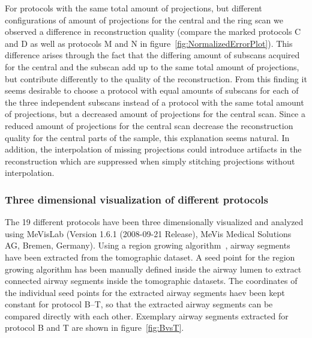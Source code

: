 For protocols with the same total amount of projections, but different configurations of amount of projections for the central and the ring scan we observed a difference in reconstruction quality (compare the marked protocols C and D as well as protocols M and N in figure~\ref{fig:NormalizedErrorPlot}). This difference arises through the fact that the differing amount of subscans acquired for the central and the subscan add up to the same total amount of projections, but contribute differently to the quality of the reconstruction. From this finding it seems desirable to choose a protocol with equal amounts of subscans for each of the three independent subscans instead of a protocol with the same total amount of projections, but a decreased amount of projections for the central scan. Since a reduced amount of projections for the central scan decrease the reconstruction quality for the central parts of the sample, this explanation seems natural. In addition, the interpolation of missing projections could introduce artifacts in the reconstruction which are suppressed when simply stitching projections without interpolation.

\subsubsection{Three dimensional visualization of different protocols}%
\label{subsec:comparison}%
The 19 different protocols have been three dimensionally visualized and analyzed using MeVisLab (Version 1.6.1 (2008-09-21 Release), MeVis Medical Solutions AG, Bremen, Germany). Using a region growing algorithm~\cite{wiki:regiongrowing}, airway segments have been extracted from the tomographic dataset.  A seed point for the region growing algorithm has been manually defined inside the airway lumen to extract connected airway segments inside the tomographic datasets. The coordinates of the individual seed points for the extracted airway segments haev been kept constant for protocol B--T, so that the extracted airway segments can be compared directly with each other. Exemplary airway segments extracted for protocol B and T are shown in figure~\ref{fig:BvsT}.

